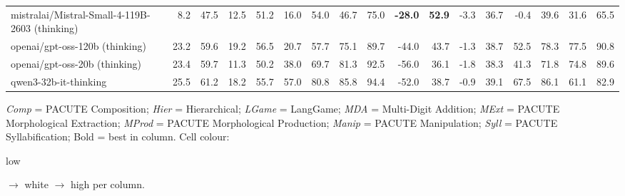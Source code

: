 \documentclass{article}
\begin{document}
\begin{table}[htbp]
\begin{threeparttable}
\begin{adjustbox}{max width=\textwidth}
\begin{tabular}{lrrrrrrrrrrrrrrrr}
mistralai/Mistral-Small-4-119B-2603 (thinking) & \cellcolor[HTML]{F9D2C1}8.2 & \cellcolor[HTML]{FAD8CA}47.5 & \cellcolor[HTML]{FEF8F6}12.5 & \cellcolor[HTML]{F9FCFD}51.2 & \cellcolor[HTML]{F4A582}16.0 & \cellcolor[HTML]{F4A582}54.0 & \cellcolor[HTML]{FCE6DD}46.7 & \cellcolor[HTML]{FDF3EF}75.0 & \cellcolor[HTML]{92C5DE}\textbf{-28.0} & \cellcolor[HTML]{92C5DE}\textbf{52.9} & \cellcolor[HTML]{FADDD0}-3.3 & \cellcolor[HTML]{FBDED2}36.7 & \cellcolor[HTML]{F4AB8B}-0.4 & \cellcolor[HTML]{F5AF90}39.6 & \cellcolor[HTML]{FEFBF9}31.6 & \cellcolor[HTML]{EAF3F8}65.5 \\
openai/gpt-oss-120b (thinking) & \cellcolor[HTML]{CCE4EF}23.2 & \cellcolor[HTML]{C5E0ED}59.6 & \cellcolor[HTML]{E5F1F7}19.2 & \cellcolor[HTML]{D9EAF3}56.5 & \cellcolor[HTML]{F5B497}20.7 & \cellcolor[HTML]{F6B89D}57.7 & \cellcolor[HTML]{BEDCEB}75.1 & \cellcolor[HTML]{B4D7E8}89.7 & \cellcolor[HTML]{FDF2ED}-44.0 & \cellcolor[HTML]{FEF6F3}43.7 & \cellcolor[HTML]{EAF4F8}-1.3 & \cellcolor[HTML]{E8F2F8}38.7 & \cellcolor[HTML]{E8F2F8}52.5 & \cellcolor[HTML]{D2E7F1}78.3 & \cellcolor[HTML]{97C7DF}77.5 & \cellcolor[HTML]{95C6DE}90.8 \\
openai/gpt-oss-20b (thinking) & \cellcolor[HTML]{CBE3EF}23.4 & \cellcolor[HTML]{C4DFED}59.7 & \cellcolor[HTML]{FDF3EF}11.3 & \cellcolor[HTML]{FEFEFE}50.2 & \cellcolor[HTML]{FCEEE7}38.0 & \cellcolor[HTML]{FEF9F7}69.7 & \cellcolor[HTML]{A9D1E5}81.3 & \cellcolor[HTML]{A3CEE3}92.5 & \cellcolor[HTML]{F4A582}-56.0 & \cellcolor[HTML]{F4A582}36.1 & \cellcolor[HTML]{F8FBFC}-1.8 & \cellcolor[HTML]{F5FAFC}38.3 & \cellcolor[HTML]{FEFCFB}41.3 & \cellcolor[HTML]{E9F3F8}71.8 & \cellcolor[HTML]{9DCBE1}74.8 & \cellcolor[HTML]{99C8E0}89.6 \\
qwen3-32b-it-thinking & \cellcolor[HTML]{BCDBEA}25.5 & \cellcolor[HTML]{B7D8E9}61.2 & \cellcolor[HTML]{EAF3F8}18.2 & \cellcolor[HTML]{DDEDF4}55.7 & \cellcolor[HTML]{C6E0ED}57.0 & \cellcolor[HTML]{BCDBEA}80.8 & \cellcolor[HTML]{9AC9E0}85.8 & \cellcolor[HTML]{98C8E0}94.4 & \cellcolor[HTML]{F7BEA5}-52.0 & \cellcolor[HTML]{F7C1A9}38.7 & \cellcolor[HTML]{DCECF4}-0.9 & \cellcolor[HTML]{DAEBF4}39.1 & \cellcolor[HTML]{C5E0ED}67.5 & \cellcolor[HTML]{B5D8E8}86.1 & \cellcolor[HTML]{BDDCEB}61.1 & \cellcolor[HTML]{AFD4E6}82.9 \\
\bottomrule
\end{tabular}
\end{adjustbox}
\begin{tablenotes}[flushleft]\footnotesize
\item \textit{Comp} = PACUTE Composition; \textit{Hier} = Hierarchical; \textit{LGame} = LangGame; \textit{MDA} = Multi-Digit Addition; \textit{MExt} = PACUTE Morphological Extraction; \textit{MProd} = PACUTE Morphological Production; \textit{Manip} = PACUTE Manipulation; \textit{Syll} = PACUTE Syllabification; Bold = best in column. Cell colour: \colorbox[HTML]{F4A582}{\strut low} $\to$ white $\to$ \colorbox[HTML]{92C5DE}{high} per column.
\end{tablenotes}
\end{threeparttable}
\end{table}
\end{document}
